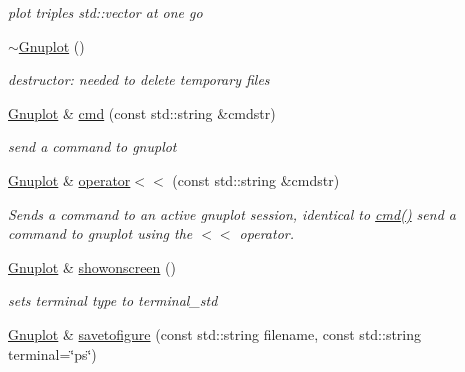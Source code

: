 \begin{DoxyCompactItemize}
\begin{DoxyCompactList}\small\item\em plot triples std\-::vector at one go \end{DoxyCompactList}\item 
\hypertarget{class_gnuplot_a78a68f621caa87d1f34324fcd093c7bd}{\hyperlink{class_gnuplot_a78a68f621caa87d1f34324fcd093c7bd}{$\sim$\-Gnuplot} ()}\label{class_gnuplot_a78a68f621caa87d1f34324fcd093c7bd}

\begin{DoxyCompactList}\small\item\em destructor\-: needed to delete temporary files \end{DoxyCompactList}\item 
\hypertarget{class_gnuplot_a07607803ede8dd5416906df0a1924fc5}{\hyperlink{class_gnuplot}{Gnuplot} \& \hyperlink{class_gnuplot_a07607803ede8dd5416906df0a1924fc5}{cmd} (const std\-::string \&cmdstr)}\label{class_gnuplot_a07607803ede8dd5416906df0a1924fc5}

\begin{DoxyCompactList}\small\item\em send a command to gnuplot \end{DoxyCompactList}\item 
\hyperlink{class_gnuplot}{Gnuplot} \& \hyperlink{class_gnuplot_afb69631c7a498077e378a3cbb56f38c8}{operator$<$$<$} (const std\-::string \&cmdstr)
\begin{DoxyCompactList}\small\item\em Sends a command to an active gnuplot session, identical to \hyperlink{class_gnuplot_a07607803ede8dd5416906df0a1924fc5}{cmd()} send a command to gnuplot using the $<$$<$ operator. \end{DoxyCompactList}\item 
\hypertarget{class_gnuplot_a356d2faaa79f08d13fec9718b776b28d}{\hyperlink{class_gnuplot}{Gnuplot} \& \hyperlink{class_gnuplot_a356d2faaa79f08d13fec9718b776b28d}{showonscreen} ()}\label{class_gnuplot_a356d2faaa79f08d13fec9718b776b28d}

\begin{DoxyCompactList}\small\item\em sets terminal type to terminal\-\_\-std \end{DoxyCompactList}\item 
\hypertarget{class_gnuplot_a1ccaa142290490429c6cd623543a914c}{\hyperlink{class_gnuplot}{Gnuplot} \& \hyperlink{class_gnuplot_a1ccaa142290490429c6cd623543a914c}{savetofigure} (const std\-::string filename, const std\-::string terminal=\char`\"{}ps\char`\"{})}\label{class_gnuplot_a1ccaa142290490429c6cd623543a914c}


\end{DoxyCompactItemize}
